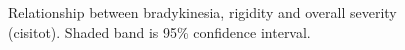 \documentclass[10pt]{article}
\begin{document}
\begin{multicols}{2}
\begin{figure}[H]
  \centering

  \caption{Relationship between \protect{} bradykinesia,
  \protect{} rigidity and overall severity (cisitot). Shaded band
is 95\% confidence interval.}
  \label{fig:corrxy-br}
\end{figure}

\begin{figure}[H]
  \centering


\end{figure}
\end{multicols}
\end{document}
